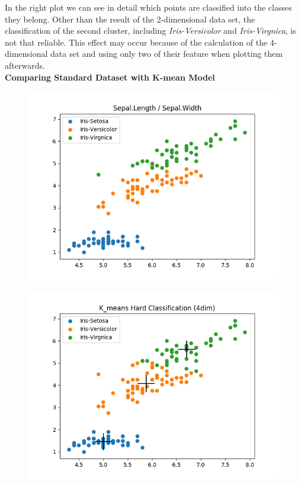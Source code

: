\documentclass[a4paper]{article}
\begin{document}
\noindent
In the right plot we can see in detail which points are classified into the classes they belong. Other than the result of the 2-dimensional data set, the classification of the second cluster, including \textit{Iris-Versicolor} and \textit{Iris-Virgnica}, is not that reliable. This effect may occur because of the calculation of the 4-dimensional data set and using only two of their feature when plotting them afterwards. \\

\noindent
{\large \textbf{Comparing Standard Dataset with K-mean Model}} \\

  
\begin{figure}[htp]
\centering
\begin{minipage}{0.4\textwidth}
  \includegraphics[scale=0.5]{plots/basic_scenario2_cmpnt3.png}
  \label{fig:16}
\end{minipage}
\hfill
\begin{minipage}{0.4\textwidth}
  \includegraphics[scale=0.5]{plots/hard_classification_scenario2_cmpnt3.png}
  \label{fig:17}
\end{minipage}
\end{figure}
\end{document}
